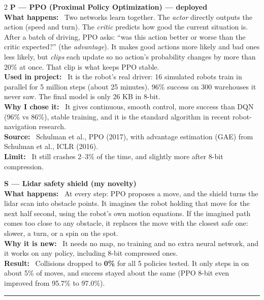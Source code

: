 \documentclass[10pt,a4paper]{extarticle}
\newcommand{\hd}[1]{\par\vspace{6pt}{\color{acc}\large\bfseries #1}\par\vspace{2pt}\hrule\vspace{4pt}}
\newcommand{\lbl}[1]{\textbf{#1:}~}
\begin{document}
\begin{multicols}{2}
\textbf{P --- PPO (Proximal Policy Optimization) --- deployed}\\
\lbl{What happens} Two networks learn together. The \emph{actor} directly outputs the action (speed and turn). The
\emph{critic} predicts how good the current situation is. After a batch of driving, PPO asks: ``was this action
better or worse than the critic expected?'' (the \emph{advantage}). It makes good actions more likely and bad ones
less likely, but \emph{clips} each update so no action's probability changes by more than 20\% at once. That clip
is what keeps PPO stable.\\
\lbl{Used in project} It is the robot's real driver: 16 simulated robots train in parallel for 5 million steps
(about 25 minutes). 96\% success on 300 warehouses it never saw. The final model is only 26 KB in 8-bit.\\
\lbl{Why I chose it} It gives continuous, smooth control, more success than DQN (96\% vs 86\%), stable training, and
it is the standard algorithm in recent robot-navigation research.\\
\lbl{Source} Schulman et al., PPO (2017), with advantage estimation (GAE) from Schulman et al., ICLR (2016).\\
\lbl{Limit} It still crashes 2--3\% of the time, and slightly more after 8-bit compression.

\textbf{S --- Lidar safety shield (my novelty)}\\
\lbl{What happens} At every step: PPO proposes a move, and the shield turns the lidar scan into obstacle points. It
imagines the robot holding that move for the next half second, using the robot's own motion equations. If the
imagined path comes too close to any obstacle, it replaces the move with the closest safe one: slower, a turn, or
a spin on the spot.\\
\lbl{Why it is new} It needs no map, no training and no extra neural network, and it works on any policy, including
8-bit compressed ones.\\
\lbl{Result} Collisions dropped to \textbf{0\%} for all 5 policies tested. It only steps in on about 5\% of moves, and
success stayed about the same (PPO 8-bit even improved from 95.7\% to 97.0\%).

\end{multicols}
\newpage
\hd{4. Research I used, and what I took from each}
\end{document}
